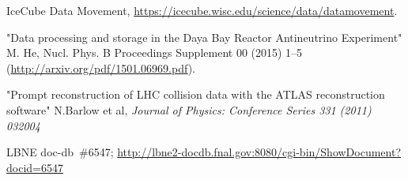 \begin{thebibliography}{99}
%
%

%
%

 IceCube Data Movement, \url{https://icecube.wisc.edu/science/data/datamovement}.

"Data processing and storage in the Daya Bay Reactor Antineutrino Experiment" M. He, Nucl. Phys. B Proceedings Supplement 00 (2015) 1–5 (\url{http://arxiv.org/pdf/1501.06969.pdf}).

 "Prompt reconstruction of LHC collision data with the ATLAS reconstruction software" N.Barlow et al, \textit{Journal of Physics: Conference Series 331 (2011) 032004}

%
%
 
%
%
 LBNE doc-db~\#6547; \url{http://lbne2-docdb.fnal.gov:8080/cgi-bin/ShowDocument?docid=6547}

%
%


\end{thebibliography}
